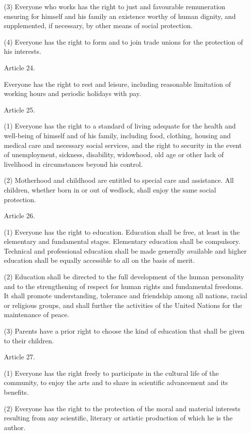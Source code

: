 \documentclass[11pt,a4paper]{article}
\begin{document}
(3) Everyone who works has the right to just and favourable remuneration ensuring for himself and his family an existence worthy of human dignity, and supplemented, if necessary, by other means of social protection.

(4) Everyone has the right to form and to join trade unions for the protection of his interests.

Article 24.

Everyone has the right to rest and leisure, including reasonable limitation of working hours and periodic holidays with pay.

Article 25.

(1) Everyone has the right to a standard of living adequate for the health and well-being of himself and of his family, including food, clothing, housing and medical care and necessary social services, and the right to security in the event of unemployment, sickness, disability, widowhood, old age or other lack of livelihood in circumstances beyond his control.

(2) Motherhood and childhood are entitled to special care and assistance. All children, whether born in or out of wedlock, shall enjoy the same social protection.

Article 26.

(1) Everyone has the right to education. Education shall be free, at least in the elementary and fundamental stages. Elementary education shall be compulsory. Technical and professional education shall be made generally available and higher education shall be equally accessible to all on the basis of merit.

(2) Education shall be directed to the full development of the human personality and to the strengthening of respect for human rights and fundamental freedoms. It shall promote understanding, tolerance and friendship among all nations, racial or religious groups, and shall further the activities of the United Nations for the maintenance of peace.

(3) Parents have a prior right to choose the kind of education that shall be given to their children.

Article 27.

(1) Everyone has the right freely to participate in the cultural life of the community, to enjoy the arts and to share in scientific advancement and its benefits.

(2) Everyone has the right to the protection of the moral and material interests resulting from any scientific, literary or artistic production of which he is the author.
\end{document}
